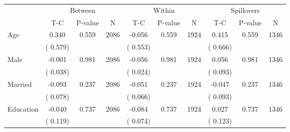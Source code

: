 
\begin{tabular}{l*{9}{c}}\hline&\multicolumn{3}{c}{Between}&\multicolumn{3}{c}{Within}&\multicolumn{3}{c}{Spillovers} \\ \cmidrule(r){2-4}\cmidrule(l){5-7}\cmidrule(l){8-10} & {T-C} & {P-value} & {N} & {T-C} & {P-value} & {N}  & {T-C} & {P-value} & {N}  \\ \midrule
 Age                 &              0.340          &        0.559 & 2086          &             -0.056          &        0.559 & 1924          &        0.415 &        0.559 & 1346                                 \\ 
                               &        (       0.579) & &                                                                 &       (       0.553) & &                                                          &       (       0.666)      & &                             \\ 
 Male                 &             -0.001          &        0.981 & 2086          &             -0.056 &        0.981 & 1924                   &        0.056 &        0.981 & 1346                                 \\ 
                               &        (       0.038) & &                                                                 &       (       0.024) & &                                                          &       (       0.093) & &                                          \\ 
 Married                 &             -0.093          &        0.237 & 2086          &             -0.051 &        0.237 & 1924                   &       -0.047 &        0.237 & 1346                                 \\ 
                               &        (       0.078) & &                                                                 &       (       0.066) & &                                                          &       (       0.093) & &                                          \\ 
 Education                 &             -0.040          &        0.737 & 2086          &             -0.084 &        0.737 & 1924                   &        0.027 &        0.737 & 1346                                 \\ 
                               &        (       0.119) & &                                                                 &       (       0.074) & &                                                          &       (       0.123) & &                                          \\ 

\end{tabular}
